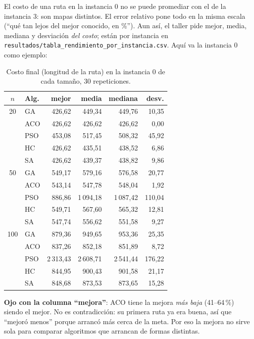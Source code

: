 \documentclass[11pt,a4paper]{article}
\newcommand{\archivo}[1]{\texttt{#1}}
\begin{document}
\begin{porque}
El costo de una ruta en la instancia 0 no se puede promediar con el de la instancia 3: son mapas distintos. El error relativo pone todo en la misma escala
(``qué tan lejos del mejor conocido, en \%''). Aun así, el taller pide mejor, media, mediana y desviación \emph{del costo}; están por instancia en
\archivo{resultados/tabla\_rendimiento\_por\_instancia.csv}. Aquí va la instancia 0 como ejemplo:
\end{porque}

\begin{table}[H]\centering\small
\begin{tabular}{clrrrr}
\toprule
$n$ & Alg. & mejor & media & mediana & desv. \\
\midrule
20 & GA & 426{,}62 & 449{,}34 & 449{,}76 & 10{,}35 \\
 & ACO & 426{,}62 & 426{,}62 & 426{,}62 & 0{,}00 \\
 & PSO & 453{,}08 & 517{,}45 & 508{,}32 & 45{,}92 \\
 & HC & 426{,}62 & 435{,}51 & 438{,}52 & 6{,}86 \\
 & SA & 426{,}62 & 439{,}37 & 438{,}82 & 9{,}86 \\
\midrule
50 & GA & 549{,}17 & 579{,}16 & 576{,}58 & 20{,}77 \\
 & ACO & 543{,}14 & 547{,}78 & 548{,}04 & 1{,}92 \\
 & PSO & 886{,}86 & 1\,094{,}18 & 1\,087{,}42 & 110{,}04 \\
 & HC & 549{,}71 & 567{,}60 & 565{,}32 & 12{,}81 \\
 & SA & 547{,}74 & 556{,}62 & 551{,}58 & 9{,}27 \\
\midrule
100 & GA & 879{,}36 & 949{,}65 & 953{,}36 & 25{,}35 \\
 & ACO & 837{,}26 & 852{,}18 & 851{,}89 & 8{,}72 \\
 & PSO & 2\,313{,}43 & 2\,608{,}71 & 2\,541{,}44 & 176{,}22 \\
 & HC & 844{,}95 & 900{,}43 & 901{,}58 & 21{,}17 \\
 & SA & 848{,}68 & 873{,}53 & 873{,}65 & 15{,}28 \\
\bottomrule
\end{tabular}

\caption{Costo final (longitud de la ruta) en la instancia 0 de cada tamaño, 30 repeticiones.}
\end{table}

\textbf{Ojo con la columna ``mejora''}: ACO tiene la mejora \emph{más baja} (41--64\,\%) siendo el mejor. No es contradicción: su primera ruta ya era buena, así que
``mejoró menos'' porque arrancó más cerca de la meta. Por eso la mejora no sirve sola para comparar algoritmos que arrancan de formas distintas.
\end{document}
